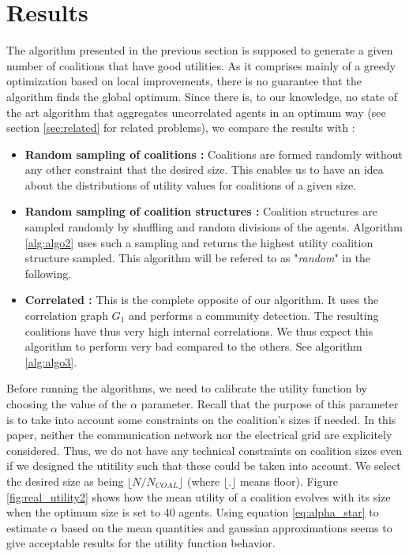 \documentclass[conference]{IEEEtran}
\begin{document}
%
%
\section{Results}
\label{sec:results}

The algorithm presented in the previous section is supposed to generate a given number of coalitions that have good utilities. As it comprises mainly of a greedy optimization based on local improvements, there is no guarantee that the algorithm finds the global optimum. Since there is, to our knowledge, no state of the art algorithm that aggregates uncorrelated agents in an optimum way (see section \ref{sec:related} for related problems), we compare the results with :

\begin{itemize}
\item \textbf{Random sampling of coalitions :} Coalitions are formed randomly without any other constraint that the desired size. This enables us to have an idea about the distributions of utility values for coalitions of a given size.
\item \textbf{Random sampling of coalition structures :} Coalition structures are sampled randomly by shuffling and random divisions of the agents. Algorithm \ref{alg:algo2} uses such a sampling and returns the highest utility coalition structure sampled. This algorithm will be refered to as "\textit{random}" in the following.
\item \textbf{Correlated :} This is the complete opposite of our algorithm. It uses the correlation graph $ G_{1} $ and performs a community detection. The resulting coalitions have thus very high internal correlations. We thus expect this algorithm to perform very bad compared to the others. See algorithm \ref{alg:algo3}.
\end{itemize} 


Before running the algorithms, we need to calibrate the utility function by choosing the value of the $ \alpha $ parameter. Recall that the purpose of this parameter is to take into account some constraints on the coalition's sizes if needed. In this paper, neither the communication network nor the electrical grid are explicitely considered. Thus, we do not have any technical constraints on coalition sizes even if we designed the utitility such that these could be taken into account. We select the desired size as being $ \lfloor N/N_{COAL} \rfloor $ (where $ \lfloor.\rfloor $ means floor). Figure \ref{fig:real_utility2} shows how the mean utility of a coalition evolves with its size when the optimum size is set to 40 agents. Using equation \ref{eq:alpha_star} to estimate $ \alpha $ based on the mean quantities and gaussian approximations seems to give acceptable results for the utility function behavior.
\end{document}
